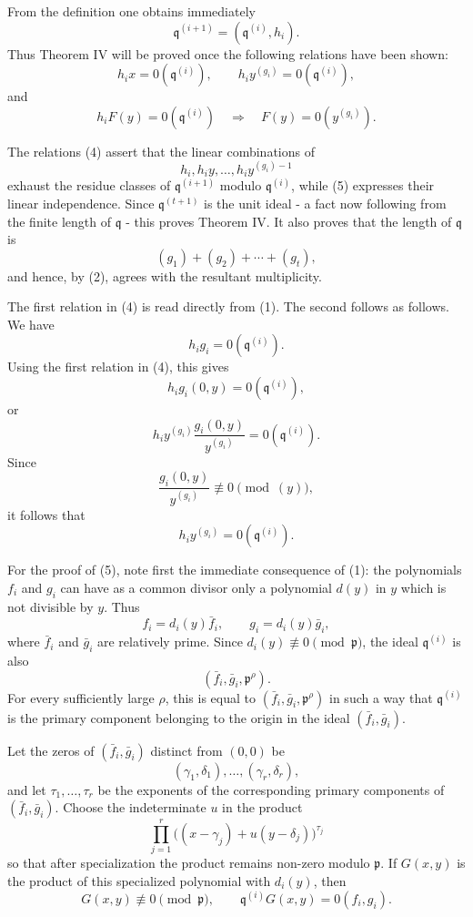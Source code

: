 \documentclass[12pt]{article}
\begin{document}
From the definition one obtains immediately
\[
  \mathfrak q^{(i+1)}=(\mathfrak q^{(i)},h_i).
\]
Thus Theorem IV will be proved once the following relations have been shown:
\[
  h_i x=0(\mathfrak q^{(i)}),
  \qquad
  h_i y^{(g_i)}=0(\mathfrak q^{(i)}),
\tag{4}
\]
and
\[
  h_iF(y)=0(\mathfrak q^{(i)})
  \quad\Longrightarrow\quad
  F(y)=0(y^{(g_i)}).
\tag{5}
\]

The relations (4) assert that the linear combinations of
\[
  h_i,
  h_i y,
  \ldots,
  h_i y^{(g_i)-1}
\]
exhaust the residue classes of \(\mathfrak q^{(i+1)}\) modulo \(\mathfrak q^{(i)}\), while (5) expresses their linear independence. Since \(\mathfrak q^{(t+1)}\) is the unit ideal - a fact now following from the finite length of \(\mathfrak q\) - this proves Theorem IV. It also proves that the length of \(\mathfrak q\) is
\[
  (g_1)+(g_2)+\cdots+(g_t),
\]
and hence, by (2), agrees with the resultant multiplicity.

The first relation in (4) is read directly from (1). The second follows as follows. We have
\[
  h_i g_i=0(\mathfrak q^{(i)}).
\]
Using the first relation in (4), this gives
\[
  h_i g_i(0,y)=0(\mathfrak q^{(i)}),
\]
or
\[
  h_i y^{(g_i)}\frac{g_i(0,y)}{y^{(g_i)}}=0(\mathfrak q^{(i)}).
\]
Since
\[
  \frac{g_i(0,y)}{y^{(g_i)}}\not\equiv 0\pmod{(y)},
\]
it follows that
\[
  h_i y^{(g_i)}=0(\mathfrak q^{(i)}).
\]

For the proof of (5), note first the immediate consequence of (1): the polynomials \(f_i\) and \(g_i\) can have as a common divisor only a polynomial \(d(y)\) in \(y\) which is not divisible by \(y\). Thus
\[
  f_i=d_i(y)\bar f_i,
  \qquad
  g_i=d_i(y)\bar g_i,
\]
where \(\bar f_i\) and \(\bar g_i\) are relatively prime. Since \(d_i(y)\not\equiv0\pmod{\mathfrak p}\), the ideal \(\mathfrak q^{(i)}\) is also
\[
  (\bar f_i,\bar g_i,\mathfrak p^{\rho}).
\]
For every sufficiently large \(\rho\), this is equal to \((\bar f_i,\bar g_i,\mathfrak p^{\rho})\) in such a way that \(\mathfrak q^{(i)}\) is the primary component belonging to the origin in the ideal \((\bar f_i,\bar g_i)\).

Let the zeros of \((\bar f_i,\bar g_i)\) distinct from \((0,0)\) be
\[
  (\gamma_1,\delta_1),\ldots,(\gamma_r,\delta_r),
\]
and let \(\tau_1,\ldots,\tau_r\) be the exponents of the corresponding primary components of \((\bar f_i,\bar g_i)\). Choose the indeterminate \(u\) in the product
\[
  \prod_{j=1}^{r}\bigl((x-
\gamma_j)+u(y-\delta_j)\bigr)^{\tau_j}
\]
so that after specialization the product remains non-zero modulo \(\mathfrak p\). If \(G(x,y)\) is the product of this specialized polynomial with \(d_i(y)\), then
\[
  G(x,y)\not\equiv0\pmod{\mathfrak p},
  \qquad
  \mathfrak q^{(i)}G(x,y)=0(f_i,g_i).
\]
\end{document}
